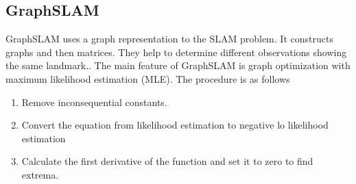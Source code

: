 \documentclass[10pt,journal,compsoc]{IEEEtran}
\begin{document}
\subsection{GraphSLAM}
GraphSLAM uses a graph representation to the SLAM problem. It constructs graphs and then matrices. They help to determine different observations showing the same landmark.\cite{wiki:gslam}. The main feature of GraphSLAM is graph optimization with maximum likelihood estimation (MLE). The procedure is as follows
\begin{enumerate}
  \item Remove inconsequential constants.
  \item Convert the equation from likelihood estimation to negative lo likelihood estimation
  \item Calculate the first derivative of the function and set it to zero to find extrema.
\end{enumerate}




\end{document}
